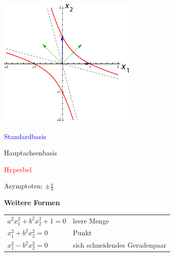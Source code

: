 {\vspace{-2mm}
\begin{center}
\begin{minipage}{0.4\columnwidth}
	\includegraphics[width=\textwidth]{10_Quadratische_Formen/hyperbel.pdf}
\end{minipage}
\hspace{1em}%
\begin{minipage}{0.3\columnwidth}
	\textcolor{blue}{Standardbasis}\par
	\textcolor{OliveGreen}{Hauptachsenbasis}\par
	\textcolor{red}{Hyperbel}\par
	Asymptoten: $\pm\frac{a}{b}$
\end{minipage}
\end{center}
\vspace{-2mm}

\textbf{Weitere Formen}\par\vskip2pt
\begin{tabular}{ll}
	$a^2x_1^2 + b^2x_2^2 + 1 = 0$ & leere Menge \\
	$x_1^2 + b^2x_2^2 = 0$        & Punkt \\
	$x_1^2 - b^2x_2^2 = 0$        & sich schneidendes Geradenpaar \\
\end{tabular}

}
\WhiteSpace